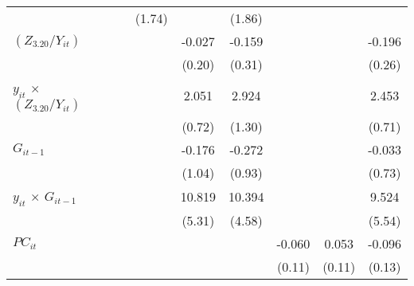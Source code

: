 \documentclass[12pt, a4paper]{article}
\begin{document}
\begin{appendices}
\begin{table}[htbp]
\begin{threeparttable}
{\begin{tabular}{l*{9}{c}}
				&                     &                     &                     &      (1.74)         &                     &      (1.86)         &                     &                     &                     \\
				$(Z_{3.20}/Y_{it})$          &                     &                     &                     &                     &      -0.027         &      -0.159         &                     &                     &      -0.196         \\
				&                     &                     &                     &                     &      (0.20)         &      (0.31)         &                     &                     &      (0.26)         \\
				$y_{it}$ $\times$ $(Z_{3.20}/Y_{it})$&                     &                     &                     &                     &       2.051\sym{**} &       2.924\sym{*}  &                     &                     &       2.453\sym{***}\\
				&                     &                     &                     &                     &      (0.72)         &      (1.30)         &                     &                     &      (0.71)         \\
				$G_{it-1}$           &                     &                     &                     &                     &      -0.176         &      -0.272         &                     &                     &      -0.033         \\
				&                     &                     &                     &                     &      (1.04)         &      (0.93)         &                     &                     &      (0.73)         \\
				$y_{it}$ $\times$ $G_{it-1}$&                     &                     &                     &                     &      10.819\sym{*}  &      10.394\sym{*}  &                     &                     &       9.524         \\
				&                     &                     &                     &                     &      (5.31)         &      (4.58)         &                     &                     &      (5.54)         \\
				$PC_{it}$                &                     &                     &                     &                     &                     &                     &      -0.060         &       0.053         &      -0.096         \\
				&                     &                     &                     &                     &                     &                     &      (0.11)         &      (0.11)         &      (0.13)         \\

\end{tabular}}
\end{threeparttable}
\end{table}
\end{appendices}
\end{document}

